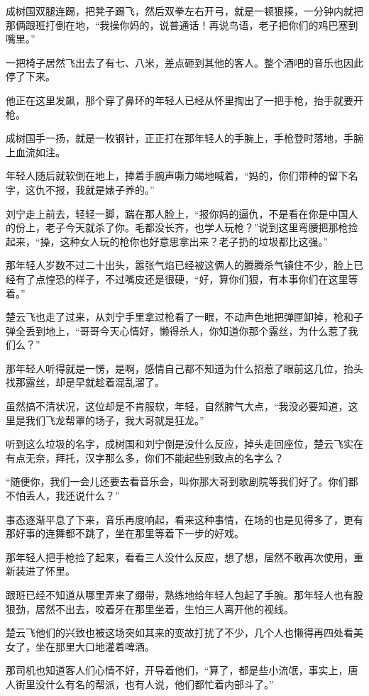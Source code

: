 成树国双腿连踢，把凳子踢飞，然后双拳左右开弓，就是一顿狠揍，一分钟内就把那俩跟班打倒在地，“我操你妈的，说普通话！再说鸟语，老子把你们的鸡巴塞到嘴里。”

一把椅子居然飞出去了有七、八米，差点砸到其他的客人。整个酒吧的音乐也因此停了下来。

他正在这里发飙，那个穿了鼻环的年轻人已经从怀里掏出了一把手枪，抬手就要开枪。

成树国手一扬，就是一枚钢针，正正打在那年轻人的手腕上，手枪登时落地，手腕上血流如注。

年轻人随后就软倒在地上，捧着手腕声嘶力竭地喊着，“妈的，你们带种的留下名字，这仇不报，我就是婊子养的。”

刘宁走上前去，轻轻一脚，踹在那人脸上，“报你妈的逼仇，不是看在你是中国人的份上，老子今天就杀了你。毛都没长齐，也学人玩枪？”说到这里弯腰把那枪捡起来，“操，这种女人玩的枪你也好意思拿出来？老子扔的垃圾都比这强。”

那年轻人岁数不过二十出头，嚣张气焰已经被这俩人的腾腾杀气镇住不少，脸上已经有了点惶恐的样子，不过嘴皮还是很硬，“好，算你们狠，有本事你们在这里等着。”

楚云飞也走了过来，从刘宁手里拿过枪看了一眼，不动声色地把弹匣卸掉，枪和子弹全丢到地上，“哥哥今天心情好，懒得杀人，你知道你那个露丝，为什么惹了我们么？”

那年轻人听得就是一愣，是啊，感情自己都不知道为什么招惹了眼前这几位，抬头找那露丝，却是早就趁着混乱溜了。

虽然搞不清状况，这位却是不肯服软，年轻，自然脾气大点，“我没必要知道，这里是我们飞龙帮罩的场子，我大哥就是狂龙。”

听到这么垃圾的名字，成树国和刘宁倒是没什么反应，掉头走回座位，楚云飞实在有点无奈，拜托，汉字那么多，你们不能起些别致点的名字么？

“随便你，我们一会儿还要去看音乐会，叫你那大哥到歌剧院等我们好了。你们都不怕丢人，我还说什么？”

事态逐渐平息了下来，音乐再度响起，看来这种事情，在场的也是见得多了，更有那好事的连舞都不跳了，坐在那里等着下一步的好戏。

那年轻人把手枪捡了起来，看看三人没什么反应，想了想，居然不敢再次使用，重新装进了怀里。

跟班已经不知道从哪里弄来了绷带，熟练地给年轻人包起了手腕。那年轻人也有股狠劲，居然不出去，咬着牙在那里坐着，生怕三人离开他的视线。

楚云飞他们的兴致也被这场突如其来的变故打扰了不少，几个人也懒得再四处看美女了，坐在那里大口地灌着啤酒。

那司机也知道客人们心情不好，开导着他们，“算了，都是些小流氓，事实上，唐人街里没什么有名的帮派，也有人说，他们都忙着内部斗了。”

